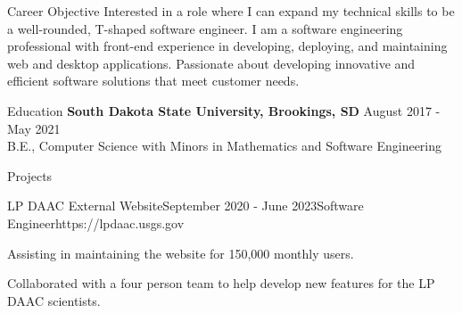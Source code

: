 \documentclass[11pt, a4paper]{resume}
\begin{document}
\begin{rSection}{Career Objective}
{\normalfont Interested in a role where I can expand my technical skills to be a well-rounded, T-shaped software engineer. I am a software engineering professional with front-end experience in developing, deploying, and maintaining web and desktop applications. Passionate about developing innovative and efficient software solutions that meet customer needs.}
\end{rSection}


\begin{rSection}{Education}
{\bf South Dakota State University, Brookings, SD} \hfill {\normalfont August 2017 - May 2021} 
\\ {\normalfont B.E., Computer Science with Minors in Mathematics and Software Engineering}\hfill 
\end{rSection}

\begin{rSection}{Projects}
\begin{rSubsection}{LP DAAC External Website}{\normalfont September 2020 - June 2023}{Software Engineer}{https://lpdaac.usgs.gov}{}
  \item{\normalfont Assisting in maintaining the website for 150,000 monthly users.}
  \item{\normalfont Collaborated with a four person team to help develop new features for the LP DAAC scientists.}
\end{rSubsection}

\end{rSection}

\end{document}
